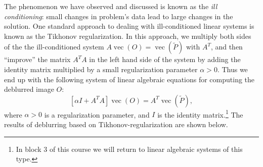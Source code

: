 \documentclass[10pt,a4paper]{article}
\theoremstyle{plain}
\theoremstyle{definition}
\DeclareMathOperator{\vc}{vec}
\begin{document}
The phenomenon we have observed and discussed is known as the \emph{ill conditioning}: small changes in problem's data lead to large changes in the solution.
One standard approach to dealing with ill-conditioned linear systems is known as the Tikhonov regularization.
In this approach, we multiply both sides of the the ill-conditioned system \(A\vc(O) = \vc(\tilde{P})\) with \(A^T\), and then ``improve'' the matrix \(A^TA\) in the left hand side of the system by adding the identity matrix multiplied by a small regularization parameter \(\alpha>0\).
Thus we end up with the following system of linear algebraic equations
for computing the deblurred image \(O\):
\[
  [\alpha I + A^T A]\vc(O) = A^T\vc(\tilde{P}),
\]
where \(\alpha>0\) is a regularization parameter, and \(I\) is the identity matrix.\footnote{%
In block 3 of this course we will return to linear algebraic systems of this type.}
The results of deblurring based on Tikhonov-regularization are shown below.
\end{document}
